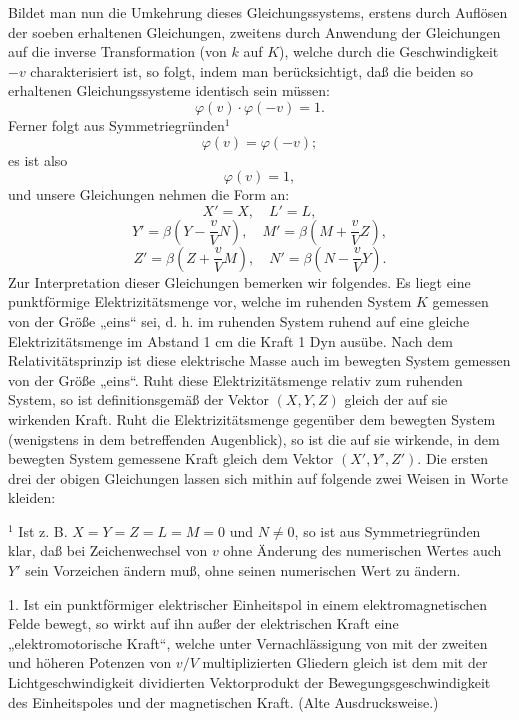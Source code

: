 \documentclass[17pt]{webarticle}       %
\begin{document}
Bildet man nun die Umkehrung dieses Gleichungssystems, erstens durch Auflösen der soeben erhaltenen Gleichungen, zweitens durch Anwendung der Gleichungen auf die inverse Transformation (von \( k \) auf \( K \)), welche durch die Geschwindigkeit \( -v \) charakterisiert ist, so folgt, indem man berücksichtigt, daß die beiden so erhaltenen Gleichungssysteme identisch sein müssen:
\[
\varphi(v) \cdot \varphi(-v) = 1.
\]
Ferner folgt aus Symmetriegründen\(^1\)
\[
\varphi(v) = \varphi(-v);
\]
es ist also
\[
\varphi(v) = 1,
\]
und unsere Gleichungen nehmen die Form an:
\[
X' = X, \quad L' = L,
\]
\[
Y' = \beta \left( Y - \frac{v}{V} N \right), \quad M' = \beta \left( M + \frac{v}{V} Z \right),
\]
\[
Z' = \beta \left( Z + \frac{v}{V} M \right), \quad N' = \beta \left( N - \frac{v}{V} Y \right).
\]
Zur Interpretation dieser Gleichungen bemerken wir folgendes. Es liegt eine punktförmige Elektrizitätsmenge vor, welche im ruhenden System \( K \) gemessen von der Größe „eins“ sei, d. h. im ruhenden System ruhend auf eine gleiche Elektrizitätsmenge im Abstand 1 cm die Kraft 1 Dyn ausübe. Nach dem Relativitätsprinzip ist diese elektrische Masse auch im bewegten System gemessen von der Größe „eins“. Ruht diese Elektrizitätsmenge relativ zum ruhenden System, so ist definitionsgemäß der Vektor \( (X, Y, Z) \) gleich der auf sie wirkenden Kraft. Ruht die Elektrizitätsmenge gegenüber dem bewegten System (wenigstens in dem betreffenden Augenblick), so ist die auf sie wirkende, in dem bewegten System gemessene Kraft gleich dem Vektor \( (X', Y', Z') \). Die ersten drei der obigen Gleichungen lassen sich mithin auf folgende zwei Weisen in Worte kleiden:

\begin{flushleft}
\footnotesize\(^1\) Ist z. B. \( X = Y = Z = L = M = 0 \) und \( N \neq 0 \), so ist aus Symmetriegründen klar, daß bei Zeichenwechsel von \( v \) ohne Änderung des numerischen Wertes auch \( Y' \) sein Vorzeichen ändern muß, ohne seinen numerischen Wert zu ändern.
\end{flushleft}

1. Ist ein punktförmiger elektrischer Einheitspol in einem elektromagnetischen Felde bewegt, so wirkt auf ihn außer der elektrischen Kraft eine „elektromotorische Kraft“, welche unter Vernachlässigung von mit der zweiten und höheren Potenzen von \( v/V \) multiplizierten Gliedern gleich ist dem mit der Lichtgeschwindigkeit dividierten Vektorprodukt der Bewegungsgeschwindigkeit des Einheitspoles und der magnetischen Kraft. (Alte Ausdrucksweise.)
\end{document}
